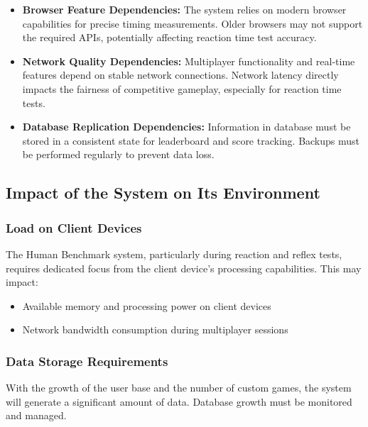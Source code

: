 \begin{itemize}
    \item \textbf{Browser Feature Dependencies:} The system relies on modern browser capabilities for precise timing measurements. Older browsers may not support the required APIs, potentially affecting reaction time test accuracy.

    \item \textbf{Network Quality Dependencies:} Multiplayer functionality and real-time features depend on stable network connections. Network latency directly impacts the fairness of competitive gameplay, especially for reaction time tests.

    \item \textbf{Database Replication Dependencies:} Information in database must be stored in a consistent state for leaderboard and score tracking. Backups must be performed regularly to prevent data loss.
\end{itemize}

\subsection{Impact of the System on Its Environment}


\subsubsection{Load on Client Devices}

The Human Benchmark system, particularly during reaction and reflex tests, requires dedicated focus from the client device's processing capabilities. This may impact:

\begin{itemize}
    \item Available memory and processing power on client devices
    \item Network bandwidth consumption during multiplayer sessions
\end{itemize}


\subsubsection{Data Storage Requirements}

With the growth of the user base and the number of custom games, the system will generate a significant amount of data. Database growth must be monitored and managed.

